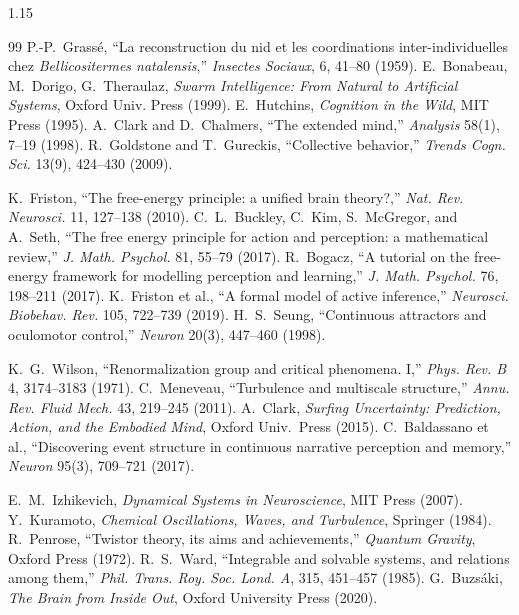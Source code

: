 \documentclass[12pt,a4paper]{article}
\begin{document}
\begin{spacing}{1.15}
\begin{thebibliography}{99}
 P.-P.~Grassé, ``La reconstruction du nid et les coordinations inter-individuelles chez \emph{Bellicositermes natalensis},'' \emph{Insectes Sociaux}, 6, 41–80 (1959).
 E.~Bonabeau, M.~Dorigo, G.~Theraulaz, \emph{Swarm Intelligence: From Natural to Artificial Systems}, Oxford Univ. Press (1999).
 E.~Hutchins, \emph{Cognition in the Wild}, MIT Press (1995).
 A.~Clark and D.~Chalmers, ``The extended mind,'' \emph{Analysis} 58(1), 7–19 (1998).
 R.~Goldstone and T.~Gureckis, ``Collective behavior,'' \emph{Trends Cogn. Sci.} 13(9), 424–430 (2009).

 K.~Friston, ``The free-energy principle: a unified brain theory?,'' \emph{Nat. Rev. Neurosci.} 11, 127–138 (2010).
 C.~L.~Buckley, C.~Kim, S.~McGregor, and A.~Seth, ``The free energy principle for action and perception: a mathematical review,'' \emph{J. Math. Psychol.} 81, 55–79 (2017).
 R.~Bogacz, ``A tutorial on the free-energy framework for modelling perception and learning,'' \emph{J. Math. Psychol.} 76, 198–211 (2017).
 K.~Friston et al., ``A formal model of active inference,'' \emph{Neurosci. Biobehav. Rev.} 105, 722–739 (2019).
 H.~S.~Seung, ``Continuous attractors and oculomotor control,'' \emph{Neuron} 20(3), 447–460 (1998).


 K.~G.~Wilson, ``Renormalization group and critical phenomena. I,'' \emph{Phys. Rev. B} 4, 3174–3183 (1971).
 C.~Meneveau, ``Turbulence and multiscale structure,'' \emph{Annu. Rev. Fluid Mech.} 43, 219–245 (2011).
 A.~Clark, \emph{Surfing Uncertainty: Prediction, Action, and the Embodied Mind}, Oxford Univ.~Press (2015).
 C.~Baldassano et al., ``Discovering event structure in continuous narrative perception and memory,'' \emph{Neuron} 95(3), 709–721 (2017).

 E.~M.~Izhikevich, \emph{Dynamical Systems in Neuroscience}, MIT Press (2007).
 Y.~Kuramoto, \emph{Chemical Oscillations, Waves, and Turbulence}, Springer (1984).
 R.~Penrose, ``Twistor theory, its aims and achievements,'' \emph{Quantum Gravity}, Oxford Press (1972).
 R.~S.~Ward, ``Integrable and solvable systems, and relations among them,'' \emph{Phil. Trans. Roy. Soc. Lond. A}, 315, 451–457 (1985).
 G.~Buzsáki, \emph{The Brain from Inside Out}, Oxford University Press (2020).


\end{thebibliography}
\end{spacing}
\end{document}
